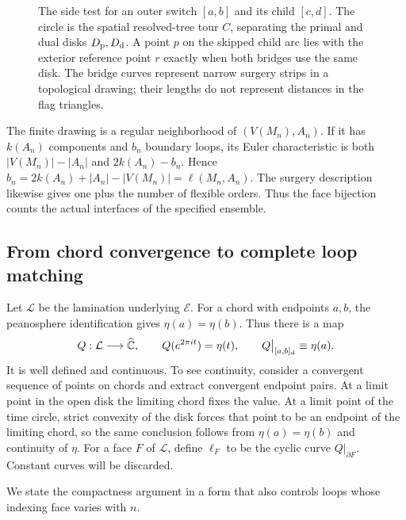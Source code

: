 \begin{figure}[ht]
\centering

\caption{The side test for an outer switch $[a,b]$ and its child
$[c,d]$.  The circle is the spatial resolved-tree tour $C$, separating
the primal and dual disks $D_{\rm p},D_{\rm d}$.  A point $p$ on
the skipped child arc lies with the exterior reference point $r$
exactly when both bridges use the same disk.  The bridge curves
represent narrow surgery strips in a topological drawing; their
lengths do not represent distances in the flag triangles.}
\label{loop:surgery-sides-figure}
\end{figure}

\begin{remark}\label{loop:count}
The finite drawing is a regular neighborhood of $(V(M_n),A_n)$.
If it has $k(A_n)$ components and $b_n$ boundary loops, its Euler
characteristic is both $|V(M_n)|-|A_n|$ and $2k(A_n)-b_n$.  Hence
$b_n=2k(A_n)+|A_n|-|V(M_n)|=\ell(M_n,A_n)$.  The surgery description
likewise gives one plus the number of flexible orders.  Thus the face
bijection counts the actual interfaces of the specified ensemble.
\end{remark}

\subsection{From chord convergence to complete loop matching}

Let $\mathcal L$ be the lamination underlying $\mathcal E$.  For a chord
with endpoints $a,b$, the peanosphere identification gives
$\eta(a)=\eta(b)$.  Thus there is a map
\[
 Q:\mathcal L\longrightarrow\widehat{\mathbb C},
 \qquad Q(e^{2\pi it})=\eta(t),
 \qquad Q\big|_{[a,b]_{\rm d}}\equiv\eta(a).
\]
It is well defined and continuous.  To see continuity, consider a
convergent sequence of points on chords and extract convergent endpoint
pairs.  At a limit point in the open disk the limiting chord fixes the
value.  At a limit point of the time circle, strict convexity of the disk
forces that point to be an endpoint of the limiting chord, so the same
conclusion follows from $\eta(a)=\eta(b)$ and continuity of $\eta$.
For a face $F$ of $\mathcal L$, define $\ell_F$ to be the cyclic curve
$Q|_{\partial F}$.  Constant curves will be discarded.

We state the compactness argument in a form that also controls loops
whose indexing face varies with $n$.


